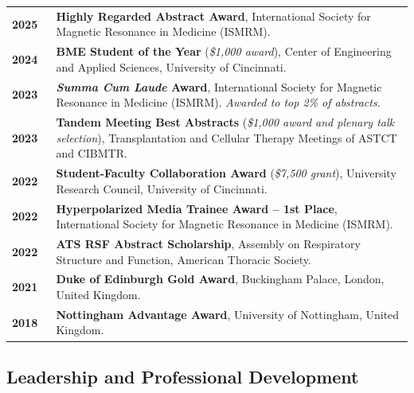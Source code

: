 \documentclass[11pt,]{scrartcl}
\begin{document}
\begin{table}[h!]
{\def\arraystretch{1.4}\tabcolsep=0pt
\begin{tabular}{p{0.11\linewidth}p{0.89\linewidth}}

    \textbf{2025} & \textbf{Highly Regarded Abstract Award}, International Society for Magnetic Resonance in Medicine (ISMRM). \\[0.1cm]

    \textbf{2024} & \textbf{BME Student of the Year} (\textit{\$1,000 award}), Center of Engineering and Applied Sciences, University of Cincinnati. \\[0.1cm]
    
    \textbf{2023} & \textbf{\textit{Summa Cum Laude} Award}, International Society for Magnetic Resonance in Medicine (ISMRM). \textit{Awarded to top 2\% of abstracts.} \\[0.1cm]
    
    \textbf{2023} & \textbf{Tandem Meeting Best Abstracts} (\textit{\$1,000 award and plenary talk selection}), Transplantation and Cellular Therapy Meetings of ASTCT and CIBMTR. \\[0.1cm]
    
    \textbf{2022} & \textbf{Student-Faculty Collaboration Award} (\textit{\$7,500 grant}), University Research Council, University of Cincinnati. \\[0.1cm]
    
    \textbf{2022} & \textbf{Hyperpolarized Media Trainee Award -- 1st Place}, International Society for Magnetic Resonance in Medicine (ISMRM). \\[0.1cm]
    
    \textbf{2022} & \textbf{ATS RSF Abstract Scholarship}, Assembly on Respiratory Structure and Function, American Thoracic Society. \\[0.1cm]

    \textbf{2021} & \textbf{Duke of Edinburgh Gold Award}, Buckingham Palace, London, United Kingdom. \\[0.1cm]
  
    \textbf{2018} & \textbf{Nottingham Advantage Award}, University of Nottingham, United Kingdom. \\

\end{tabular}%
}
\end{table}

\subsection{Leadership and Professional Development}
\end{document}
